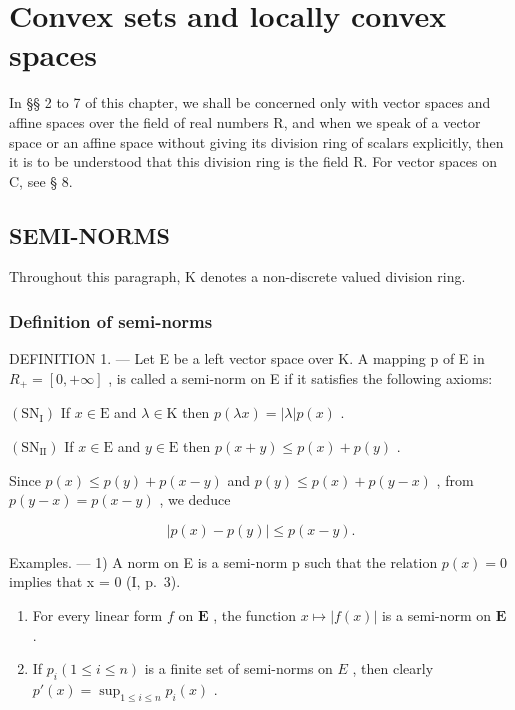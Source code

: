 \chapter{Convex sets and locally convex spaces}

In §§ 2 to 7 of this chapter, we shall be concerned only with vector spaces and affine spaces over the field of real numbers R, and when we speak of a vector space or an affine space without giving its division ring of scalars explicitly, then it is to be understood that this division ring is the field R. For vector spaces on C, see § 8.

\section{SEMI-NORMS}

Throughout this paragraph, K denotes a non-discrete valued division ring.

\subsection{Definition of semi-norms}

DEFINITION 1. --- Let E be a left vector space over K. A mapping p of E in \(R_{+} = \left[0, +\infty\right]\) , is called a semi-norm on E if it satisfies the following axioms:

\((\mathrm{SN}_{\mathrm{I}})\) If \(x \in \mathrm{E}\) and \(\lambda \in \mathrm{K}\) then \(p(\lambda x) = |\lambda| p(x)\) .

\((\mathrm{SN}_{\mathrm{II}})\) If \(x \in \mathrm{E}\) and \(y \in \mathrm{E}\) then \(p(x + y) \leqslant p(x) + p(y)\) .

Since \(p(x) \leqslant p(y) + p(x - y)\) and \(p(y) \leqslant p(x) + p(y - x)\) , from \(p(y - x) = p(x - y)\) , we deduce

\[
\left| p (x) - p (y) \right| \leqslant p (x - y).\tag{1}
\]

Examples. --- 1) A norm on E is a semi-norm p such that the relation \(p(x) = 0\) implies that x = 0 (I, p.~3).

\begin{enumerate}
\def\labelenumi{\arabic{enumi})}
\setcounter{enumi}{1}
\item
  For every linear form \(f\) on \(\mathbf{E}\) , the function \(x \mapsto |f(x)|\) is a semi-norm on \(\mathbf{E}\) .
\item
  If \(p_i (1 \leqslant i \leqslant n)\) is a finite set of semi-norms on \(E\) , then clearly \(p'(x) = \sup_{1 \leqslant i \leqslant n} p_i(x)\) .
\end{enumerate}

